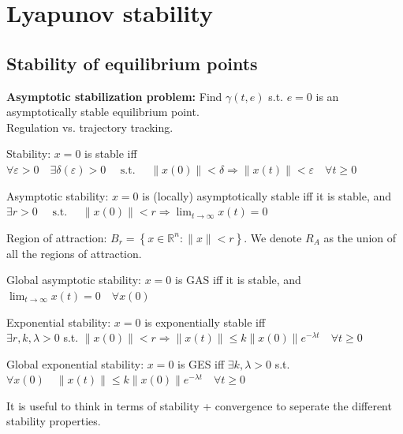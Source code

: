 \section{Lyapunov stability}
\subsection{Stability of equilibrium points}
\textbf{Asymptotic stabilization problem:}
Find $\gamma(t, e)$ s.t. $e=0$ is an asymptotically stable equilibrium point.\\
Regulation vs. trajectory tracking.

\begin{definition}
    Stability: $x=0$ is stable iff
    $\forall \varepsilon>0 \quad \exists \delta(\varepsilon)>0 \quad \text { s.t. } \quad\|x(0)\|<\delta \Rightarrow\|x(t)\|<\varepsilon \quad \forall t \geq 0$
\end{definition}
\begin{definition}
    Asymptotic stability: $x = 0$ is (locally) asymptotically stable iff it is stable, and\\
    $\exists r>0 \quad \text { s.t. } \quad\|x(0)\|<r \Rightarrow \lim _{t \rightarrow \infty} x(t)=0$
\end{definition}
\begin{definition}
    Region of attraction: $B_{r}=\left\{x \in \mathbb{R}^{n}:\|x\|<r\right\}$. We denote $R_A$ as the union of all the regions of attraction.
\end{definition}
\begin{definition}
    Global asymptotic stability: $x = 0$ is GAS iff it is stable, and $\lim_{t \rightarrow \infty} x(t)=0 \quad \forall x(0)$
\end{definition}
\begin{definition}
    Exponential stability: $x = 0$ is exponentially stable iff\\
    $\exists r, k, \lambda>0$ s.t. $\|x(0)\|<r \Rightarrow\|x(t)\| \leq k\|x(0)\| e^{-\lambda t} \quad \forall t \geq 0$
\end{definition}
\begin{definition}
    Global exponential stability: $x = 0$ is GES iff
    $\exists k, \lambda>0$ s.t. $\forall x(0) \quad\|x(t)\| \leq k\|x(0)\| e^{-\lambda t} \quad \forall t \geq 0$
\end{definition}
\begin{remark}
    It is useful to think in terms of stability + convergence to seperate the different stability properties.
\end{remark}

